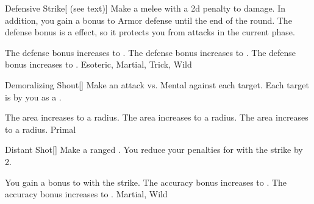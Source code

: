 \lowercase{\hypertarget{maneuver:Defensive Strike}{}}\label{maneuver:Defensive Strike}
\hypertarget{maneuver:Defensive Strike}{}
\begin{freeability}[Rank 1]{Defensive Strike}[ (see text)]
Make a melee  with a \minus2d penalty to damage.
In addition, you gain a  bonus to Armor defense until the end of the round.
The defense bonus is a  effect, so it protects you from attacks in the current phase.

\rankline
{} The defense bonus increases to .
 The defense bonus increases to .
 The defense bonus increases to .
 Esoteric, Martial, Trick, Wild
\end{freeability}
\vspace{0.25em}



\lowercase{\hypertarget{maneuver:Demoralizing Shout}{}}\label{maneuver:Demoralizing Shout}
\hypertarget{maneuver:Demoralizing Shout}{}
\begin{freeability}[Rank 1]{Demoralizing Shout}[]
Make an attack vs. Mental against each target.
\hit Each target is  by you as a .

\rankline
{} The area increases to a \areamed radius.
 The area increases to a \arealarge radius.
 The area increases to a \areahuge radius.
 Primal
\end{freeability}
\vspace{0.25em}



\lowercase{\hypertarget{maneuver:Distant Shot}{}}\label{maneuver:Distant Shot}
\hypertarget{maneuver:Distant Shot}{}
\begin{freeability}[Rank 1]{Distant Shot}[]
Make a ranged .
You reduce your penalties for  with the strike by 2.

\rankline
{} You gain a  bonus to  with the strike.
 The accuracy bonus increases to .
 The accuracy bonus increases to .
 Martial, Wild
\end{freeability}
\vspace{0.25em}



